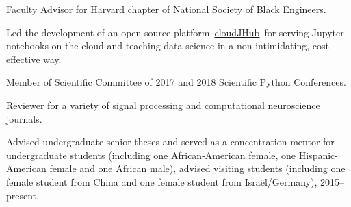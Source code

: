 \documentclass[12pt]{article}
\renewenvironment{itemize}{
  \begin{list}{}{
    \setlength{\itemsep}{0.25em}
    \setlength{\parskip}{0pt}
    \setlength{\parsep}{0.25em}
  }
}{
  \end{list}
}
\begin{document}
\begin{itemize}
  \item[\textbullet] Faculty Advisor for Harvard chapter of National Society of Black Engineers.
  \item[\textbullet] Led the development of an open-source platform--\href{https://github.com/harvard/cloudJHub}{cloudJHub}--for serving Jupyter notebooks on the cloud and teaching data-science in a non-intimidating, cost-effective way.
  \item[\textbullet] Member of Scientific Committee of 2017 and 2018 Scientific Python Conferences.
  \item[\textbullet] Reviewer for a variety of signal processing and computational neuroscience journals.
  \item[\textbullet] Advised undergraduate senior theses and served as a concentration mentor for undergraduate students (including one African-American female, one Hispanic-American female and one African male), advised visiting students (including one female student from China and one female student from Isra\"{e}l/Germany), 2015--present.
\end{itemize}




\end{document}
